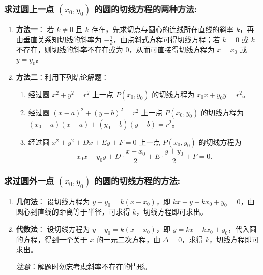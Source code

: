 \documentclass{article}
\begin{document}
\subsubsection*{求过圆上一点 $(x_0, y_0)$ 的圆的切线方程的两种方法:}

\begin{enumerate}
    \item \textbf{方法一}：
    若 $k \neq 0$ 且 $k$ 存在，先求切点与圆心的连线所在直线的斜率 $k$，再由垂直关系知切线的斜率为 $-\frac{1}{k}$，由点斜式方程可得切线方程；若 $k = 0$ 或 $k$ 不存在，则切线的斜率不存在或为 $0$，从而可直接得切线方程为 $x = x_0$ 或 $y = y_0$。

    \item \textbf{方法二}：利用下列结论解题：
    \begin{enumerate}
        \item 经过圆 $x^2 + y^2 = r^2$ 上一点 $P(x_0, y_0)$ 的切线方程为 $x_0x + y_0y = r^2$。
        \item 经过圆 $(x - a)^2 + (y - b)^2 = r^2$ 上一点 $P(x_0, y_0)$ 的切线方程为 $(x_0 - a)(x - a) + (y_0 - b)(y - b) = r^2$。
        \item 经过圆 $x^2 + y^2 + Dx + Ey + F = 0$ 上一点 $P(x_0, y_0)$ 的切线方程为
        \[
        x_0x + y_0y + D \cdot \frac{x + x_0}{2} + E \cdot \frac{y + y_0}{2} + F = 0.
        \]
    \end{enumerate}
\end{enumerate}

\subsubsection*{求过圆外一点 $(x_0, y_0)$ 的圆的切线方程的方法:}

\begin{enumerate}
    \item \textbf{几何法}：
    设切线方程为 $y - y_0 = k(x - x_0)$，即 $kx - y - kx_0 + y_0 = 0$，由圆心到直线的距离等于半径，可求得 $k$，切线方程即可求出。

    \item \textbf{代数法}：
    设切线方程为 $y - y_0 = k(x - x_0)$，即 $y = kx - kx_0 + y_0$，代入圆的方程，得到一个关于 $x$ 的一元二次方程，由 $\Delta = 0$，求得 $k$，切线方程即可求出。

    \textit{注意}：解题时勿忘考虑斜率不存在的情形。
\end{enumerate}
\end{document}
